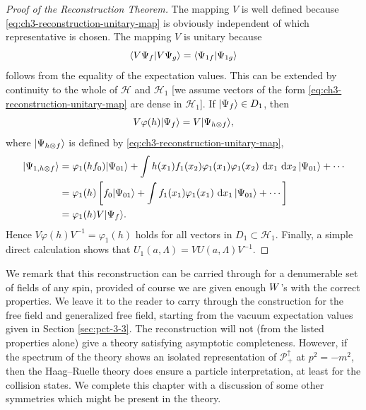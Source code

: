 \begin{proof}[Proof of the Reconstruction Theorem]
The mapping \(V\) is well defined because \eqref{eq:ch3-reconstruction-unitary-map} is obviously independent of
which representative is chosen.  The mapping \(V\) is unitary because
\begin{equation*}
\langle V\Psi_f\vert V\Psi_g\rangle=\langle \Psi_{1f}\vert \Psi_{1g}\rangle
\end{equation*}
follows from the equality of the expectation values.  This can be extended
by continuity to the whole of \(\mathcal H\) and \(\mathcal H_1\) [we assume
vectors of the form \eqref{eq:ch3-reconstruction-unitary-map} are dense in \(\mathcal H_1\)].  If
\(\lvert \Psi_f\rangle\in D_1\), then
\begin{equation*}
V\varphi(h)\lvert \Psi_f\rangle=V\lvert \Psi_{h\otimes f}\rangle,
\end{equation*}
where \(\lvert \Psi_{h\otimes f}\rangle\) is defined by \eqref{eq:ch3-reconstruction-unitary-map},
\begin{equation*}
\begin{aligned}
\lvert \Psi_{1,h\otimes f}\rangle
 &=\varphi_1(hf_0)\lvert \Psi_{01}\rangle
 +\int h(x_1)f_1(x_2)\varphi_1(x_1)\varphi_1(x_2)\,\mathop{}\!\mathrm{d} x_1\,\mathop{}\!\mathrm{d} x_2\,\lvert \Psi_{01}\rangle+\cdots\\
 &=\varphi_1(h)\left[f_0\lvert \Psi_{01}\rangle
 +\int f_1(x_1)\varphi_1(x_1)\,\mathop{}\!\mathrm{d} x_1\,\lvert \Psi_{01}\rangle+\cdots\right]\\
 &=\varphi_1(h)V\lvert \Psi_f\rangle.
\end{aligned}
\end{equation*}
Hence \(V\varphi(h)V^{-1}=\varphi_1(h)\) holds for all vectors in
\(D_1\subset\mathcal H_1\).  Finally, a simple direct calculation shows that
\(U_1(a,\Lambda)=VU(a,\Lambda)V^{-1}\).
\end{proof}

We remark that this reconstruction can be carried through for a denumerable
set of fields of any spin, provided of course we are given enough
\(W\)'s with the correct properties.  We leave it to the reader to
carry through the construction for the free field and generalized free field,
starting from the vacuum expectation values given in Section \ref{sec:pct-3-3}.  The
reconstruction will not (from the listed properties alone) give a theory
satisfying asymptotic completeness.  However, if the spectrum of the theory
shows an isolated representation of \(\mathcal{P}_+^\uparrow\) at
\(p^2=-m^2\), then the Haag--Ruelle theory does ensure a particle
interpretation, at least for the collision states.  We complete this chapter
with a discussion of some other symmetries which might be present in the
theory.
